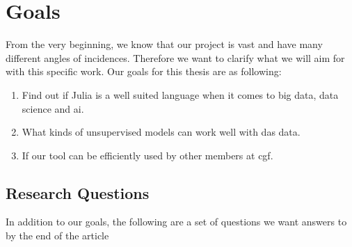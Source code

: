\section{Goals}

From the very beginning, we know that our project is vast and have many different angles of incidences. Therefore we want to clarify what we will aim for with this specific work.
Our goals for this thesis are as following: 

\begin{enumerate}
    \item Find out if Julia is a well suited language when it comes to big data, data science and \acrshort{ai}.
    \item What kinds of unsupervised models can work well with \acrshort{das} data.
    \item If our tool can be efficiently used by other members at \acrshort{cgf}.
\end{enumerate}


\subsection{Research Questions}

In addition to our goals, the following are a set of questions we want answers to by the end of the article

